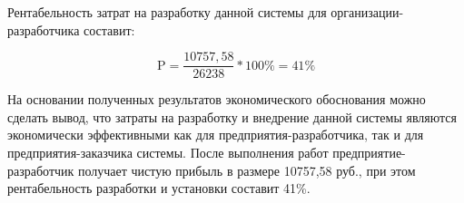 Рентабельность затрат на разработку данной системы для организации-разработчика составит:

\begin{equation}
  \label{eq:economics:profit}
  \text{P} = \dfrac{10757,58}{26238} * 100\% = 41\% %
\end{equation}

На основании полученных результатов экономического обоснования можно сделать вывод,
что затраты на разработку и внедрение данной системы являются экономически эффективными
как для предприятия-разработчика, так и для предприятия-заказчика системы. После выполнения
работ предприятие-разработчик получает чистую прибыль в размере 10757,58 руб., при этом
рентабельность разработки и установки составит 41\%.
